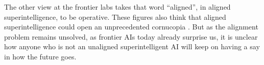 The other view at the frontier labs takes that word ``aligned'', in aligned
superintelligence, to be operative. These figures also think that aligned
superintelligence could open an unprecedented cornucopia
\cite{bostrom2014superintelligence,bostrom2024utopia}. But as the alignment
problem remains unsolved, as frontier AIs today already surprise us, it is
unclear how anyone who is not an unaligned superintelligent AI will keep on
having a say in how the future goes.
